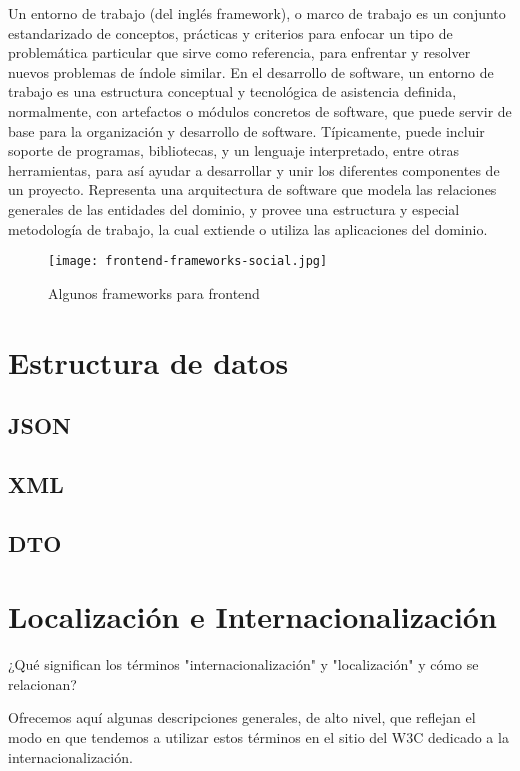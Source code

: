 \begin{enumerate}
\cite{wiki}Un entorno de trabajo (del inglés framework), o marco de trabajo es un conjunto estandarizado
de conceptos, prácticas y criterios para enfocar un tipo de problemática particular que sirve como
referencia, para enfrentar y resolver nuevos problemas de índole similar.
En el desarrollo de software, un entorno de trabajo es una estructura conceptual y tecnológica
de asistencia definida, normalmente, con artefactos o módulos concretos de software, que puede
servir de base para la organización y desarrollo de software. Típicamente, puede incluir soporte
de programas, bibliotecas, y un lenguaje interpretado, entre otras herramientas, para así ayudar a
desarrollar y unir los diferentes componentes de un proyecto.
Representa una arquitectura de software que modela las relaciones generales de las entidades del
dominio, y provee una estructura y especial metodología de trabajo, la cual extiende o utiliza las
aplicaciones del dominio.

\begin{figure}[H]
	\center
	\texttt{[image: frontend-frameworks-social.jpg]}
	\caption{Algunos frameworks para frontend}
	\label{fig:super}
\end{figure}

\section{Estructura de datos}

\subsection{JSON}

\subsection{XML}

\subsection{DTO}

\section{Localización e Internacionalización}

\cite{w3}¿Qué significan los términos "internacionalización" y "localización" y cómo se relacionan?

Ofrecemos aquí algunas descripciones generales, de alto nivel, que reflejan el modo en que tendemos a utilizar estos términos en el sitio del W3C dedicado a la internacionalización.


\end{enumerate}
